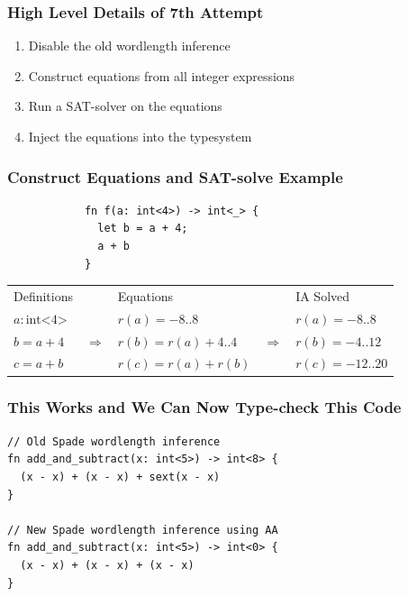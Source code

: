 \documentclass{beamer}
\begin{document}
\begin{frame}[containsverbatim]
\frametitle{High Level Details of 7th Attempt}
\begin{enumerate}
  \item Disable the old wordlength inference
  \item Construct equations from all integer expressions
  \item Run a SAT-solver on the equations 
  \item Inject the equations into the typesystem
\end{enumerate}
\end{frame}

\begin{frame}[containsverbatim]
\frametitle{Construct Equations and SAT-solve Example}
\begin{center}
\begin{verbatim}
            fn f(a: int<4>) -> int<_> {
              let b = a + 4;
              a + b
            }
\end{verbatim}
\begin{tabular}{l c l c l}
 Definitions & & Equations & & IA Solved \\
 $a : \textrm{int<}4\textrm{>}$ & & $r(a) = -8..8$ & & $r(a) = -8..8$ \\
 $b = a + 4$ & $\Rightarrow$ & $r(b) = r(a) + 4..4$ & $\Rightarrow$ & $r(b) = -4..12$\\
 $c = a + b$ & & $r(c) = r(a) + r(b)$ & & $r(c) = -12..20$ \\
\end{tabular}
\end{center}
\end{frame}

\begin{frame}[containsverbatim]
\footnotesize
\frametitle{This Works and We Can Now Type-check This Code}
\begin{verbatim}
// Old Spade wordlength inference
fn add_and_subtract(x: int<5>) -> int<8> {
  (x - x) + (x - x) + sext(x - x)
}

// New Spade wordlength inference using AA
fn add_and_subtract(x: int<5>) -> int<0> {
  (x - x) + (x - x) + (x - x)
}
\end{verbatim}
\end{frame}
\end{document}
